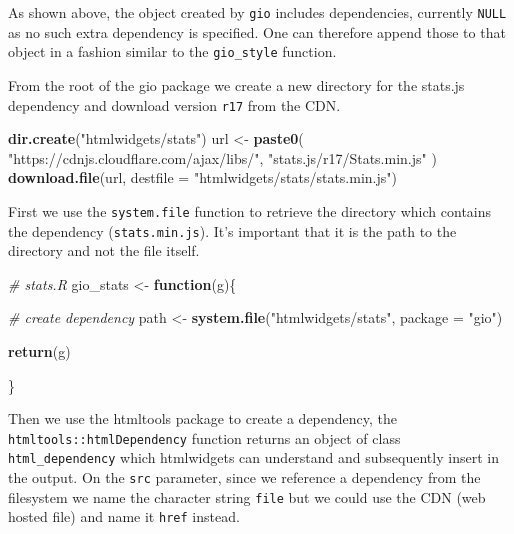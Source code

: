 \documentclass[
]{krantz}
\makeatletter
\newenvironment{Shaded}{\begin{snugshade}}{\end{snugshade}}
\newcommand{\CommentTok}[1]{\textcolor[rgb]{0.37,0.37,0.37}{\textit{#1}}}
\newcommand{\ControlFlowTok}[1]{\textcolor[rgb]{0.27,0.27,0.27}{\textbf{#1}}}
\newcommand{\DataTypeTok}[1]{\textcolor[rgb]{0.27,0.27,0.27}{#1}}
\newcommand{\KeywordTok}[1]{\textcolor[rgb]{0.27,0.27,0.27}{\textbf{#1}}}
\newcommand{\NormalTok}[1]{#1}
\newcommand{\StringTok}[1]{\textcolor[rgb]{0.5,0.5,0.5}{#1}}
\newenvironment{kframe}{%
\medskip{}
\setlength{\fboxsep}{.8em}
 \def\at@end@of@kframe{}%
 \ifinner\ifhmode%
  \def\at@end@of@kframe{\end{minipage}}%
  \begin{minipage}{\columnwidth}%
 \fi\fi%
 \def\FrameCommand##1{\hskip\@totalleftmargin \hskip-\fboxsep
 \colorbox{shadecolor}{##1}\hskip-\fboxsep
     \hskip-\linewidth \hskip-\@totalleftmargin \hskip\columnwidth}%
 \MakeFramed {\advance\hsize-\width
   \@totalleftmargin\z@ \linewidth\hsize
   \@setminipage}}%
 {\par\unskip\endMakeFramed%
 \at@end@of@kframe}
\renewenvironment{Shaded}{\begin{kframe}}{\end{kframe}}
\makeatother
\begin{document}
As shown above, the object created by \texttt{gio} includes dependencies, currently \texttt{NULL} as no such extra dependency is specified. One can therefore append those to that object in a fashion similar to the \texttt{gio\_style} function.

From the root of the gio package we create a new directory for the stats.js dependency and download version \texttt{r17} from the CDN.

\begin{Shaded}
\begin{Highlighting}[]
\KeywordTok{dir.create}\NormalTok{(}\StringTok{"htmlwidgets/stats"}\NormalTok{)}
\NormalTok{url \textless{}{-}}\StringTok{ }\KeywordTok{paste0}\NormalTok{(}
  \StringTok{"https://cdnjs.cloudflare.com/ajax/libs/"}\NormalTok{,}
  \StringTok{"stats.js/r17/Stats.min.js"}
\NormalTok{)}
\KeywordTok{download.file}\NormalTok{(url, }\DataTypeTok{destfile =} \StringTok{"htmlwidgets/stats/stats.min.js"}\NormalTok{)}
\end{Highlighting}
\end{Shaded}

First we use the \texttt{system.file} function to retrieve the directory which contains the dependency (\texttt{stats.min.js}). It's important that it is the path to the directory and not the file itself.

\begin{Shaded}
\begin{Highlighting}[]
\CommentTok{\# stats.R}
\NormalTok{gio\_stats \textless{}{-}}\StringTok{ }\ControlFlowTok{function}\NormalTok{(g)\{}

  \CommentTok{\# create dependency}
\NormalTok{  path \textless{}{-}}\StringTok{ }\KeywordTok{system.file}\NormalTok{(}\StringTok{"htmlwidgets/stats"}\NormalTok{, }\DataTypeTok{package =} \StringTok{"gio"}\NormalTok{)}

  \KeywordTok{return}\NormalTok{(g)}

\NormalTok{\}}
\end{Highlighting}
\end{Shaded}

Then we use the htmltools package to create a dependency, the \texttt{htmltools::htmlDependency} function returns an object of class \texttt{html\_dependency} which htmlwidgets can understand and subsequently insert in the output. On the \texttt{src} parameter, since we reference a dependency from the filesystem we name the character string \texttt{file} but we could use the CDN (web hosted file) and name it \texttt{href} instead.
\end{document}
